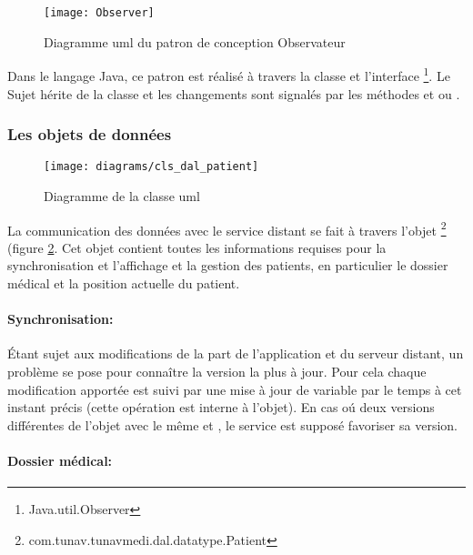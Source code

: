 \begin{figure}[H]
\center
\texttt{[image: Observer]}
\caption{Diagramme \gls{uml} du patron de conception Observateur~\cite{wikipedia:observer}}
\label{fig:observer}
\end{figure}

Dans le langage Java, ce patron est réalisé à travers la classe  et l'interface \footnote{Java.util.Observer}. Le Sujet hérite de la classe  et les changements sont signalés par les méthodes  et  ou .

\subsubsection{Les objets de données}

\begin{figure}
\center
\texttt{[image: diagrams/cls\_dal\_patient]}
\caption{Diagramme de la classe \gls{uml}  }
\label{fig:cls_dal_patient}
\end{figure}

La communication des données avec le service distant se fait à travers l'objet \footnote{com.tunav.tunavmedi.dal.datatype.Patient} (figure \ref{fig:cls_dal_patient}. Cet objet contient toutes les informations requises pour la synchronisation et l'affichage et la gestion des patients, en particulier le dossier médical et la position actuelle du patient.

\paragraph{Synchronisation:}

Étant sujet aux modifications de la part de l'application et du serveur distant, un problème se pose pour connaître la version la plus à jour. Pour cela chaque modification apportée est suivi par une mise à jour de variable  par le temps à cet instant précis (cette opération est interne à l'objet). En cas oú deux versions différentes de l'objet  avec le même  et , le service est supposé favoriser sa version.

\paragraph{Dossier médical:}

